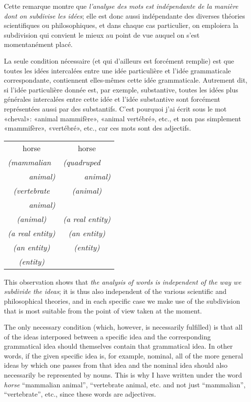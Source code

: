 \begin{sloppypar}
{  Cette remarque montre que \emph{l’analyse des mots est indépendante
    de la manière dont on subdivise les idées}; elle est donc aussi
  indépendante des diverses théories scientifiques ou philosophiques,
  et dans chaque cas particulier, on emploiera la subdivision qui
  convient le mieux au point de vue auquel on s’est momentanément
  placé.

  La seule condition nécessaire (et qui d’ailleurs est forcément
  remplie) est que toutes les idées intercalées entre une idée
  particulière et l’idée grammaticale correspondante, contiennent
  elles-mêmes cette idée grammaticale. Autrement dit, si l’idée
  particulière donnée est, par exemple, substantive, toutes les idées
  plus générales intercalées entre cette idée et l’idée substantive
  sont forcément représentées aussi par des substantifs. C’est
  pourquoi j’ai écrit sous le mot «cheval»: «animal mammifère»,
  «animal vertébré», etc., et non pas simplement «mammifère»,
  «vertébré», etc., car ces mots sont des adjectifs.  } %
{
  \begin{center}
    \begin{tabular}[t]{cc}
      horse & horse\\
      \multicolumn{1}{l}{\emph{(mammalian}} &
                                              \multicolumn{1}{l}{\emph{(quadruped}}\\
      \multicolumn{1}{r}{\emph{animal)}} & \multicolumn{1}{r}{\emph{animal)}}\\
      \emph{(vertebrate} & \emph{(animal)}\\
      \multicolumn{1}{r}{\emph{animal)}} & \\
      \emph{(animal)} & \emph{(a real entity)}\\
      \emph{(a real entity)} & \emph{(an entity)}\\
      \emph{(an entity)} & \emph{(entity)}\\
      \emph{(entity)} & \\
    \end{tabular}  
  \end{center}

  This observation shows that \emph{the analysis of words is
    independent of the way we subdivide the ideas}; it is thus also
  independent of the various scientific and philosophical theories,
  and in each specific case we make use of the subdivision that is
  most suitable from the point of view taken at the moment.

  The only necessary condition (which, however, is necessarily
  fulfilled) is that all of the ideas interposed between a specific
  idea and the corresponding grammatical idea should themselves
  contain that grammatical idea. In other words, if the given specific
  idea is, for example, nominal, all of the more general ideas by
  which one passes from that idea and the nominal idea should also
  necessarily be represented by nouns. This is why I have written
  under the word \emph{horse} ``mammalian animal'', ``vertebrate
  animal, etc. and not just ``mammalian'', ``vertebrate'', etc., since
  these words are adjectives.  }


\end{sloppypar}
